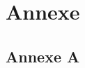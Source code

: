 

\chapter{Annexe}
\thispagestyle{empty}
\graphicspath{{Annexe1/figures/}}



\newpage
\section{Annexe A}
